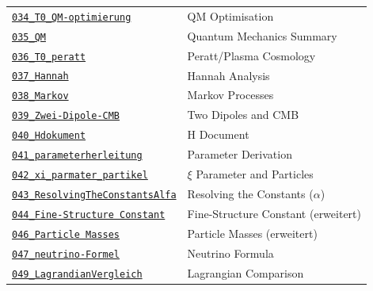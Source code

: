 {\begin{longtable}{@{}>{\raggedright\arraybackslash}p{} >{\raggedright\arraybackslash}p{}@{}}
\href{https://github.com/jpascher/T0-Time-Mass-Duality/blob/main/2/pdf/034_T0_QM-optimierung_De.pdf}{\texttt{034\_T0\_QM-optimierung}} & QM Optimisation \\
\href{https://github.com/jpascher/T0-Time-Mass-Duality/blob/main/2/pdf/035_QM_De.pdf}{\texttt{035\_QM}} & Quantum Mechanics Summary \\
\href{https://github.com/jpascher/T0-Time-Mass-Duality/blob/main/2/pdf/036_T0_peratt_De.pdf}{\texttt{036\_T0\_peratt}} & Peratt/Plasma Cosmology \\
\href{https://github.com/jpascher/T0-Time-Mass-Duality/blob/main/2/pdf/037_Hannah_De.pdf}{\texttt{037\_Hannah}} & Hannah Analysis \\
\href{https://github.com/jpascher/T0-Time-Mass-Duality/blob/main/2/pdf/038_Markov_De.pdf}{\texttt{038\_Markov}} & Markov Processes \\
\href{https://github.com/jpascher/T0-Time-Mass-Duality/blob/main/2/pdf/039_Zwei-Dipole-CMB_De.pdf}{\texttt{039\_Zwei-Dipole-CMB}} & Two Dipoles and CMB \\
\href{https://github.com/jpascher/T0-Time-Mass-Duality/blob/main/2/pdf/040_Hdokument_De.pdf}{\texttt{040\_Hdokument}} & H Document \\
\href{https://github.com/jpascher/T0-Time-Mass-Duality/blob/main/2/pdf/041_parameterherleitung_De.pdf}{\texttt{041\_parameterherleitung}} & Parameter Derivation \\
\href{https://github.com/jpascher/T0-Time-Mass-Duality/blob/main/2/pdf/042_xi_parmater_partikel_De.pdf}{\texttt{042\_xi\_parmater\_partikel}} & $\xi$ Parameter and Particles \\
\href{https://github.com/jpascher/T0-Time-Mass-Duality/blob/main/2/pdf/043_ResolvingTheConstantsAlfa_De.pdf}{\texttt{043\_ResolvingTheConstantsAlfa}} & Resolving the Constants ($\alpha$) \\
\href{https://github.com/jpascher/T0-Time-Mass-Duality/blob/main/2/pdf/044_Fine-Structure Constant_De.pdf}{\texttt{044\_Fine-Structure Constant}} & Fine-Structure Constant (erweitert) \\
\href{https://github.com/jpascher/T0-Time-Mass-Duality/blob/main/2/pdf/046_Particle Masses_De.pdf}{\texttt{046\_Particle Masses}} & Particle Masses (erweitert) \\
\href{https://github.com/jpascher/T0-Time-Mass-Duality/blob/main/2/pdf/047_neutrino-Formel_De.pdf}{\texttt{047\_neutrino-Formel}} & Neutrino Formula \\
\href{https://github.com/jpascher/T0-Time-Mass-Duality/blob/main/2/pdf/049_LagrandianVergleich_De.pdf}{\texttt{049\_LagrandianVergleich}} & Lagrangian Comparison \\

\end{longtable}}
